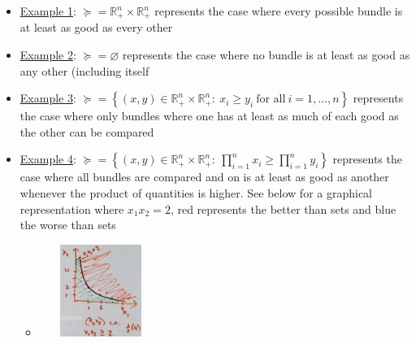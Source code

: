 \documentclass{article}
\begin{document}
  \begin{itemize}
    \item  \underline{Example 1}: $\succeq = \mathbb{R}_{+}^{n} \times \mathbb{R}_{+}^{n}$ represents the case where every possible bundle is at least as good as every other
    \item  \underline{Example 2}: $\succeq = \varnothing$ represents the case where no bundle is at least as good as any other (including itself
    \item  \underline{Example 3}: $\succeq = \left\{ (x,y) \in \mathbb{R}_{+}^{n} \times \mathbb{R}_{+}^{n}: \ x_{i} \geq y_{i} \ \text{for all} \ i = 1, \dots, n \right\}$ represents the case where only bundles where one has at least as much of each good as the other can be compared
    \item  \underline{Example 4}: $\succeq = \left\{ (x,y) \in \mathbb{R}_{+}^{n} \times \mathbb{R}_{+}^{n}: \ \prod_{i=1}^{n} x_{i} \geq \prod_{i=1}^{n} y_{i} \right\}$ represents the case where all bundles are compared and on is at least as good as another whenever the product of quantities is higher. See below for a graphical representation where $x_{1}x_{2} = 2$, red represents the better than sets and blue the worse than sets
    \begin{itemize}
      \item  \includegraphics[width=4cm, height=3cm]{pic12}
    \end{itemize}
  \end{itemize}
  \par
\vspace{6mm}
\end{document}

